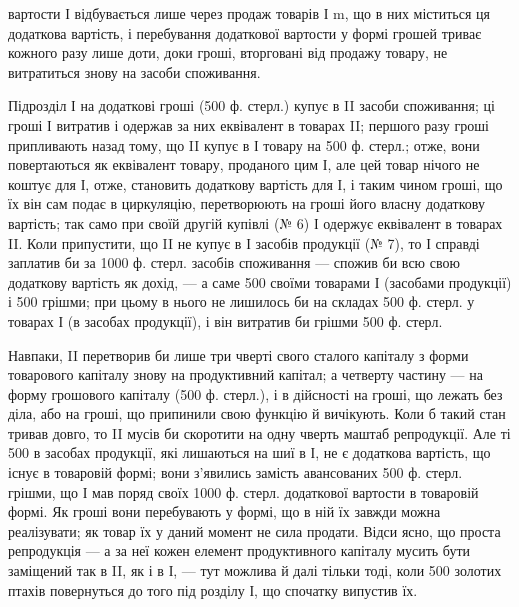 \parcont{}  %
вартости І відбувається лише через продаж товарів І m, що в них
міститься ця додаткова вартість, і перебування додаткової вартости у
формі грошей триває кожного разу лише доти, доки гроші, вторговані
від продажу товару, не витратиться знову на засоби споживання.

Підрозділ І на додаткові гроші (500 ф. стерл.) купує в II засоби
споживання; ці гроші І витратив і одержав за них еквівалент в товарах II;
першого разу гроші припливають назад тому, що II купує в І товару
на 500 ф. стерл.; отже, вони повертаються як еквівалент товару, проданого
цим І, але цей товар нічого не коштує для І, отже, становить додаткову
вартість для І, і таким чином гроші, що їх він сам
подає в циркуляцію, перетворюють на гроші його
власну додаткову вартість; так само при своїй другій купівлі
(№ 6) І одержує еквівалент в товарах II. Коли припустити, що II не
купує в І засобів продукції (№ 7), то І справді заплатив би за 1000 ф.
стерл. засобів споживання — спожив би всю свою додаткову вартість як
дохід, — а саме 500 своїми товарами І (засобами продукції) і 500 грішми;
при цьому в нього не лишилось би на складах 500 ф. стерл. у товарах І
(в засобах продукції), і він витратив би грішми 500 ф. стерл.

Навпаки, II перетворив би лише три чверті свого сталого капіталу
з форми товарового капіталу знову на продуктивний капітал; а четверту
частину — на форму грошового капіталу (500 ф. стерл.), і в дійсності на
гроші, що лежать без діла, або на гроші, що припинили свою функцію
й вичікують. Коли б такий стан тривав довго, то II мусів би скоротити
на одну чверть маштаб репродукції. Але ті 500 в засобах продукції,
які лишаються на шиї в І, не є додаткова вартість, що існує в товаровій
формі; вони з’явились замість авансованих 500 ф. стерл. грішми, що І мав
поряд своїх 1000 ф. стерл. додаткової вартости в товаровій формі. Як
гроші вони перебувають у формі, що в ній їх завжди можна реалізувати;
як товар їх у даний момент не сила продати. Відси ясно, що проста
репродукція — а за неї кожен елемент продуктивного капіталу мусить бути
заміщений так в II, як і в І, — тут можлива й далі тільки тоді, коли 500 золотих
$пт$ахів повернуться до того під розділу І, що спочатку випустив їх.


